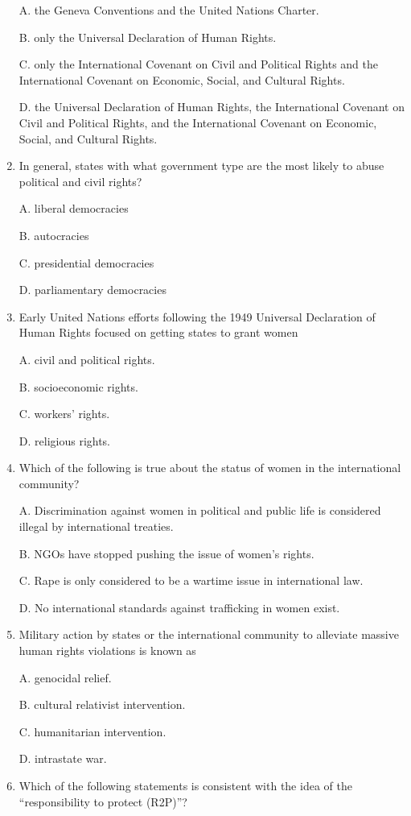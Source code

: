 \documentclass[
]{book}
\begin{document}
\begin{enumerate}
  A. the Geneva Conventions and the United Nations Charter.

  B. only the Universal Declaration of Human Rights.

  C. only the International Covenant on Civil and Political Rights and the International Covenant on Economic, Social, and Cultural Rights.

  D. the Universal Declaration of Human Rights, the International Covenant on Civil and Political Rights, and the International Covenant on Economic, Social, and Cultural Rights.
\item
  In general, states with what government type are the most likely to abuse political and civil rights?

  A. liberal democracies

  B. autocracies

  C. presidential democracies

  D. parliamentary democracies
\item
  Early United Nations efforts following the 1949 Universal Declaration of Human Rights focused on getting states to grant women

  A. civil and political rights.

  B. socioeconomic rights.

  C. workers' rights.

  D. religious rights.
\item
  Which of the following is true about the status of women in the international community?

  A. Discrimination against women in political and public life is considered illegal by international treaties.

  B. NGOs have stopped pushing the issue of women's rights.

  C. Rape is only considered to be a wartime issue in international law.

  D. No international standards against trafficking in women exist.
\item
  Military action by states or the international community to alleviate massive human rights violations is known as

  A. genocidal relief.

  B. cultural relativist intervention.

  C. humanitarian intervention.

  D. intrastate war.
\item
  Which of the following statements is consistent with the idea of the ``responsibility to protect (R2P)''?


\end{enumerate}
\end{document}
